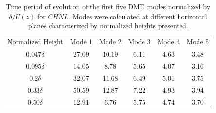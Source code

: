\begin{table}
\caption{Time period of evolution of the first five DMD modes normalized by $\delta / U(z)$ for $CHNL$. Modes were calculated at different horizontal planes characterized by normalized heights presented.}
  \begin{center}
  \begin{tabular}{  c  c c c c c  } 
  \hline
  \hline
  Normalized Height & Mode 1 & Mode 2 & Mode 3 & Mode 4 & Mode 5          \\

  \multirow{1}{4em}{$0.047\delta$}  & 27.09 & 10.19 & 6.11 & 4.63 & 3.48  \\
  \hline
  \multirow{1}{4em}{$0.095\delta$}  & 14.05 & 8.78  & 5.65 & 4.07 & 3.16  \\
  \hline
  \multirow{1}{4em}{$0.2\delta$}    & 32.07 & 11.68 & 6.49 & 5.01 & 3.75  \\
  \hline
  \multirow{1}{4em}{$0.33\delta$}   & 50.59 & 12.87 & 7.22 & 4.93 & 3.94  \\
  \hline 
  \multirow{1}{4em}{$0.50\delta$}   & 12.91 & 6.76  & 5.75 & 4.74 & 3.70  \\
  \hline
  \hline
  \end{tabular}
  \end{center}
\label{tab:dmd_freq_chnl}
\end{table}


